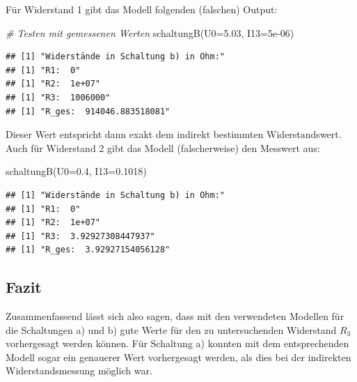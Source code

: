 \documentclass[class=article, crop=false]{standalone}
\newenvironment{Shaded}{\begin{snugshade}}{\end{snugshade}}
\newcommand{\AttributeTok}[1]{\textcolor[rgb]{0.77,0.63,0.00}{#1}}
\newcommand{\CommentTok}[1]{\textcolor[rgb]{0.56,0.35,0.01}{\textit{#1}}}
\newcommand{\FloatTok}[1]{\textcolor[rgb]{0.00,0.00,0.81}{#1}}
\newcommand{\FunctionTok}[1]{\textcolor[rgb]{0.00,0.00,0.00}{#1}}
\newcommand{\NormalTok}[1]{#1}
\begin{document}
Für Widerstand 1 gibt das Modell folgenden (falschen) Output:

\begin{Shaded}
\begin{Highlighting}[]
\CommentTok{\# Testen mit gemessenen Werten}
\FunctionTok{schaltungB}\NormalTok{(}\AttributeTok{U0=}\FloatTok{5.03}\NormalTok{, }\AttributeTok{I13=}\FloatTok{5e{-}06}\NormalTok{)}
\end{Highlighting}
\end{Shaded}

\begin{verbatim}
## [1] "Widerstände in Schaltung b) in Ohm:"
## [1] "R1:  0"
## [1] "R2:  1e+07"
## [1] "R3:  1006000"
## [1] "R_ges:  914046.883518081"
\end{verbatim}

Dieser Wert entspricht dann exakt dem indirekt bestimmten
Widerstandswert. Auch für Widerstand 2 gibt das Modell (falscherweise)
den Messwert aus:

\begin{Shaded}
\begin{Highlighting}[]
\FunctionTok{schaltungB}\NormalTok{(}\AttributeTok{U0=}\FloatTok{0.4}\NormalTok{, }\AttributeTok{I13=}\FloatTok{0.1018}\NormalTok{)}
\end{Highlighting}
\end{Shaded}

\begin{verbatim}
## [1] "Widerstände in Schaltung b) in Ohm:"
## [1] "R1:  0"
## [1] "R2:  1e+07"
## [1] "R3:  3.92927308447937"
## [1] "R_ges:  3.92927154056128"
\end{verbatim}

\hypertarget{fazit}{%
\subsection{Fazit}\label{fazit}}

Zusammenfassend lässt sich also sagen, dass mit den verwendeten Modellen
für die Schaltungen a) und b) gute Werte für den zu untersuchenden
Widerstand \(R_3\) vorhergesagt werden können. Für Schaltung a) konnten
mit dem entsprechenden Modell sogar ein genauerer Wert vorhergesagt
werden, als dies bei der indirekten Widerstandsmessung möglich war.
\end{document}
